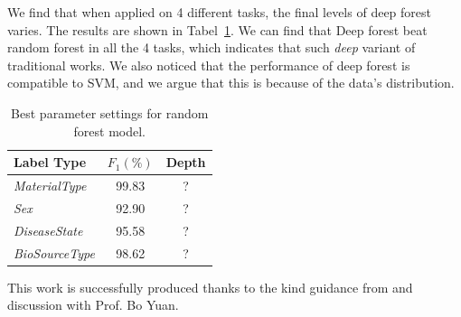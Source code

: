 \documentclass[sigconf]{acmart}
\begin{document}
We find that when applied on 4 different tasks, the final levels of deep forest varies. The results are shown in Tabel~\ref{tab:DeepForest}. We can find that Deep forest beat random forest in all the 4 tasks, which indicates that such \textit{deep} variant of traditional works. We also noticed that the performance of deep forest is compatible to SVM, and we argue that this is because of the data's distribution.
\begin{table}[tbp]
	\centering
	\begin{tabular}{l|cc}
		\toprule
		{Label Type} & $F_1 (\%)$&Depth\\
		\midrule
		{\textit{MaterialType}}&99.83 &?\\
		{\textit{Sex}}		& 92.90  &?\\
		{\textit{DiseaseState}}& 95.58 &? \\
		{\textit{BioSourceType}}& 98.62 &?\\
		\bottomrule	
	\end{tabular}
	\caption{Best parameter settings for random forest model. }
	\label{tab:DeepForest}
\end{table}



	\begin{acks}
	This work is successfully produced thanks to the kind guidance from and discussion with Prof. Bo Yuan.
	\end{acks}
	
	
	
	{\small
		
		 	
	}
	
\end{document}
